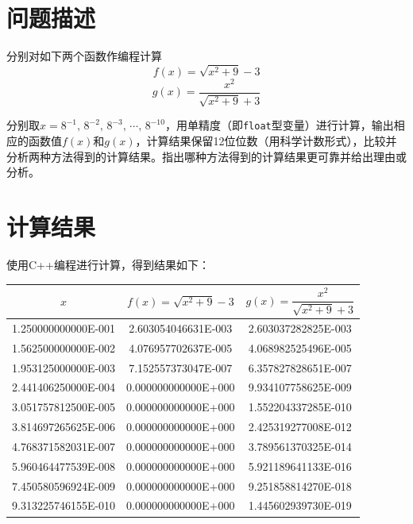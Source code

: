 \documentclass[11pt]{article}
\begin{document}
\maketitle %

\thispagestyle{empty} %

\newpage

\section{问题描述}
分别对如下两个函数作编程计算
$$
    f(x) = \sqrt{x^2 + 9} - 3
$$
$$
    g(x) = \frac{x^2}{\sqrt{x^2 + 9} + 3}
$$

分别取$x = 8^{-1},\, 8^{-2},\, 8^{-3},\, \cdots,\, 8^{-10}$，用单精度（即\texttt{float}型变量）进行计算，输出相应的函数值$f(x)$和$g(x)$，计算结果保留12位位数（用科学计数形式），比较并分析两种方法得到的计算结果。指出哪种方法得到的计算结果更可靠并给出理由或分析。

\section{计算结果}
使用C++编程进行计算，得到结果如下：
\begin{table}[h]
    \centering
    \begin{tabular}{|c|c|c|}
        \hline
        $x$                 & $f(x) = \sqrt{x^2 + 9} - 3$ & $g(x) = \dfrac{x^2}{\sqrt{x^2 + 9} + 3}$ \\ \hline
        1.250000000000E-001 & 2.603054046631E-003         & 2.603037282825E-003                      \\ \hline
        1.562500000000E-002 & 4.076957702637E-005         & 4.068982525496E-005                      \\ \hline
        1.953125000000E-003 & 7.152557373047E-007         & 6.357827828651E-007                      \\ \hline
        2.441406250000E-004 & 0.000000000000E+000         & 9.934107758625E-009                      \\ \hline
        3.051757812500E-005 & 0.000000000000E+000         & 1.552204337285E-010                      \\ \hline
        3.814697265625E-006 & 0.000000000000E+000         & 2.425319277008E-012                      \\ \hline
        4.768371582031E-007 & 0.000000000000E+000         & 3.789561370325E-014                      \\ \hline
        5.960464477539E-008 & 0.000000000000E+000         & 5.921189641133E-016                      \\ \hline
        7.450580596924E-009 & 0.000000000000E+000         & 9.251858814270E-018                      \\ \hline
        9.313225746155E-010 & 0.000000000000E+000         & 1.445602939730E-019                      \\ \hline
    \end{tabular}
\end{table}
\end{document}
